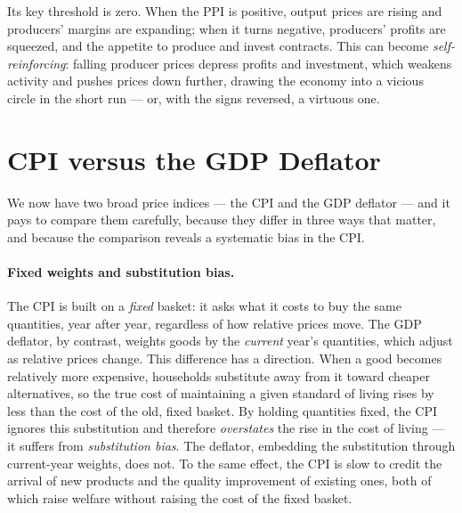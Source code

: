 Its key threshold is zero. When the PPI is positive, output prices are rising and producers' margins are expanding; when it turns negative, producers' profits are squeezed, and the appetite to produce and invest contracts. This can become \emph{self-reinforcing}: falling producer prices depress profits and investment, which weakens activity and pushes prices down further, drawing the economy into a vicious circle in the short run --- or, with the signs reversed, a virtuous one.


\section{CPI versus the GDP Deflator}

We now have two broad price indices --- the CPI and the GDP deflator --- and it pays to compare them carefully, because they differ in three ways that matter, and because the comparison reveals a systematic bias in the CPI.

\paragraph{Fixed weights and substitution bias.} The CPI is built on a \emph{fixed} basket: it asks what it costs to buy the same quantities, year after year, regardless of how relative prices move. The GDP deflator, by contrast, weights goods by the \emph{current} year's quantities, which adjust as relative prices change. This difference has a direction. When a good becomes relatively more expensive, households substitute away from it toward cheaper alternatives, so the true cost of maintaining a given standard of living rises by less than the cost of the old, fixed basket. By holding quantities fixed, the CPI ignores this substitution and therefore \emph{overstates} the rise in the cost of living --- it suffers from \emph{substitution bias}. The deflator, embedding the substitution through current-year weights, does not. To the same effect, the CPI is slow to credit the arrival of new products and the quality improvement of existing ones, both of which raise welfare without raising the cost of the fixed basket.

